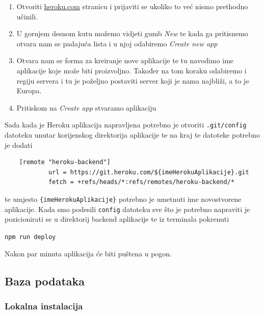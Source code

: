 								\begin{enumerate}
									\item Otvoriti \href{https://dashboard.heroku.com/apps}{heroku.com} stranicu i prijaviti se ukoliko to već nismo prethodno učinili.
									\item U gornjem desnom kutu možemo vidjeti gumb \textit{New} te kada ga pritisnemo otvara nam se padajuća lista i u njoj odabiremo \textit{Create new app}
									\item Otvara nam se forma za kreiranje nove aplikacije te tu navodimo ime aplikacije koje može biti proizvoljno. Također na tom koraku odabiremo i regiju servera i tu je poželjno postaviti server koji je nama najbliži, a to je Europa.
									\item Pritiskom na \textit{Create app} stvaramo aplikaciju
		        		\end{enumerate}
		        
		        		Sada kada je Heroku aplikacija napravljena potrebno je otvoriti \texttt{.git/config} datoteku unutar korijenskog direktorija aplikacije te na kraj te datoteke potrebno je dodati

                \begin{verbatim}
    [remote "heroku-backend"]
        	url = https://git.heroku.com/${imeHerokuAplikacije}.git
        	fetch = +refs/heads/*:refs/remotes/heroku-backend/*
								\end{verbatim}
								
								te umjesto \texttt{\{imeHerokuAplikacije\}} potrebno je umetnuti ime novostvorene aplikacije. Kada smo podesili \texttt{config} datoteku sve što je potrebno napraviti je pozicionirati se u direktorij backend aplikacije te iz terminala pokrenuti 

								\begin{center}
										\texttt{npm run deploy}
								\end{center}
								
								Nakon par minuta aplikacija će biti puštena u pogon.
						
						\pagebreak
		    
				\subsection{Baza podataka}
			
						\subsubsection*{Lokalna instalacija}
						
